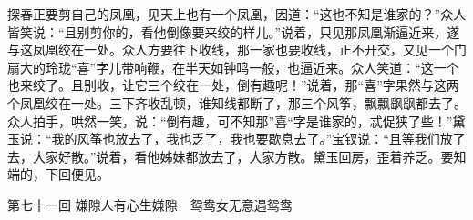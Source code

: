 \documentclass[12pt,oneside]{book}
\begin{document}
探春正要剪自己的凤凰，见天上也有一个凤凰，因道：“这也不知是谁家的？”众人皆笑说：“且别剪你的，看他倒像要来绞的样儿。”说着，只见那凤凰渐逼近来，遂与这凤凰绞在一处。众人方要往下收线，那一家也要收线，正不开交，又见一个门扇大的玲珑“喜”字儿带响鞭，在半天如钟鸣一般，也逼近来。众人笑道：“这一个也来绞了。且别收，让它三个绞在一处，倒有趣呢！”说着，那“喜”字果然与这两个凤凰绞在一处。三下齐收乱顿，谁知线都断了，那三个风筝，飘飘飖飖都去了。众人拍手，哄然一笑，说：“倒有趣，可不知那”喜“字是谁家的，忒促狭了些！”黛玉说：“我的风筝也放去了，我也乏了，我也要歇息去了。”宝钗说：“且等我们放了去，大家好散。”说着，看他姊妹都放去了，大家方散。黛玉回房，歪着养乏。要知端的，下回便见。








 
第七十一回  嫌隙人有心生嫌隙　鸳鸯女无意遇鸳鸯
\end{document}
